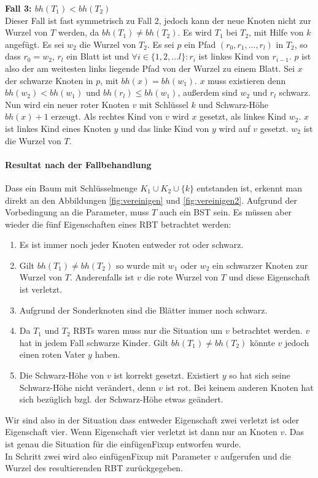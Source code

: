 \documentclass[a4paper,12pt]{article}
\begin{document}
\noindent\textbf{Fall 3: $bh(T_1) < bh(T_2)$ }\\ 
Dieser Fall ist fast symmetrisch zu Fall 2, jedoch kann der neue Knoten nicht zur Wurzel von $T$ werden, da $bh(T_1) \neq bh(T_2)$.
Es wird $T_1$ bei $T_2$, mit Hilfe von $k$ angefügt. Es sei $w_2$ die Wurzel von $T_2$. Es sei $p$ ein Pfad $(r_0,r_1,...,r_l)$ in $T_2$, so dass $r_0 = w_2$, $r_l$ ein Blatt ist und $\forall i \in \{1,2,...l\} \colon r_i$  ist linkes Kind von  $r_{i-1}$. $p$ ist also der am weitesten links liegende Pfad von der Wurzel zu einem Blatt. Sei $x$ der schwarze Knoten in $p$, mit $\mathit{bh}(x) = \mathit{bh}(w_1)$. $x$ muss existieren denn $\mathit{bh}(w_2) < \mathit{bh}(w_1)$ und $\mathit{bh}(r_l) \leq  \mathit{bh}(w_1)$, außerdem sind $w_2$ und $r_l$ schwarz.\\
Nun wird ein neuer roter Knoten $v$ mit Schlüssel $k$ und Schwarz-Höhe $\mathit{bh}(x) + 1$ erzeugt. Als rechtes Kind von $v$  wird $x$ gesetzt, als linkes Kind $w_2$. $x$ ist linkes Kind eines Knoten $y$ und das linke Kind von $y$ wird auf $v$ gesetzt. $w_2$ ist die Wurzel von $T$. \\  
 
\paragraph{Resultat nach der Fallbehandlung}
Dass ein Baum mit Schlüsselmenge  $K_1 \cup K_2 \cup \{k\} $ entstanden ist, erkennt man direkt an den Abbildungen \ref{fig:vereinigen} und \ref{fig:vereinigen2}. Aufgrund der Vorbedingung an die Parameter, muss $T$ auch ein BST sein. Es müssen aber wieder die fünf Eigenschaften eines RBT betrachtet werden:
\begin{enumerate}
	\item Es ist immer noch jeder Knoten entweder rot oder schwarz.
	\item Gilt $bh(T_1) \neq bh(T_2)$ so wurde mit $w_1$ oder $w_2$ ein schwarzer Knoten zur Wurzel von $T$. Anderenfalls ist $v$ die rote Wurzel von $T$ und diese Eigenschaft ist verletzt.   
	\item Aufgrund der Sonderknoten sind die Blätter immer noch schwarz.
	\item Da $T_1$ und $T_2$ RBTs waren muss nur die Situation um $v$ betrachtet werden. $v$ hat in jedem Fall schwarze Kinder. Gilt $bh(T_1) \neq bh(T_2)$ könnte $v$ jedoch einen roten Vater $y$ haben. 
	\item Die Schwarz-Höhe von $v$ ist korrekt gesetzt. Existiert $y$ so hat sich seine Schwarz-Höhe nicht verändert, denn $v$ ist rot. Bei keinem anderen Knoten hat sich bezüglich bzgl. der Schwarz-Höhe etwas geändert. 
\end{enumerate} 
 Wir sind also in der Situation dass entweder Eigenschaft zwei verletzt ist oder Eigenschaft vier. Wenn Eigenschaft vier verletzt ist dann nur an Knoten $v$. Das ist genau die Situation für die einfügenFixup entworfen wurde.\\
 In Schritt zwei wird also einfügenFixup mit Parameter $v$ aufgerufen und die Wurzel des resultierenden RBT zurückgegeben. 
\end{document}
